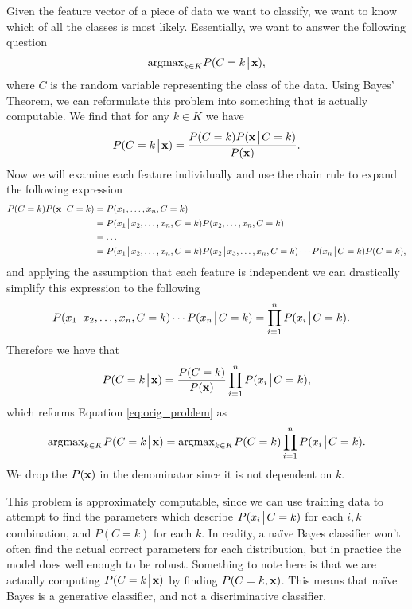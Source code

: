 Given the feature vector of a piece of data we want to classify, we want to know which of all the classes is most likely. Essentially, we want to answer the following question
\begin{equation}\label{eq:orig_problem}
    \mbox{argmax}_{k\in K} P(C=k \!\mathrel{\big|}\! \mathbf{x}),
\end{equation}
where $C$ is the random variable representing the class of the data.
Using Bayes' Theorem, we can reformulate this problem into something that is actually computable. We find that for any $k\in K$ we have
\begin{align*}
    P(C=k \!\mathrel{\big|}\! \mathbf{x}) = \frac{P(C=k)P(\mathbf{x} \!\mathrel{\big|}\! C=k)}{P(\mathbf{x})}.
\end{align*}
Now we will examine each feature individually and use the chain rule to expand the following expression
\begin{align*}
    P(C=k)P(\x \given C=k) &= P(x_1,\dots,x_n,C=k) \\
    &= P(x_1 \given x_2,\dots,x_n,C=k)P(x_2,\dots,x_n,C=k) \\
    &= \dots \\
    &= P(x_1 \given x_2,\dots,x_n,C=k)P(x_2 \given x_3, \dots, x_n,C=k)\cdots P(x_n \given C=k)P(C=k),
\end{align*}
and applying the assumption that each feature is independent we can drastically simplify this expression to the following
\begin{align*}
    P(x_1 \!\mathrel{\big|}\! x_2,\dots,x_n,C=k)\cdots P(x_n \!\mathrel{\big|}\! C=k) &= \prod_{i=1}^{n}P(x_i \!\mathrel{\big|}\! C=k).
\end{align*}
Therefore we have that 
\begin{align*}
    P(C=k \!\mathrel{\big|}\! \mathbf{x}) = \frac{P(C=k)}{P(\mathbf{x})} \prod_{i=1}^{n}P(x_i \!\mathrel{\big|}\! C=k),
\end{align*}
which reforms Equation \ref{eq:orig_problem} as
\begin{equation}\label{eq:simp_problem}
    \mbox{argmax}_{k\in K} P(C=k \!\mathrel{\big|}\! \mathbf{x}) = \mbox{argmax}_{k\in K} P(C=k)\prod_{i=1}^{n}P(x_i \!\mathrel{\big|}\! C=k).
\end{equation}
We drop the $P(\mathbf{x})$ in the denominator since it is not dependent on $k$.

This problem is approximately computable, since we can use training data to attempt to find the parameters which describe $P(x_i \!\mathrel{\big|}\! C=k)$ for each $i,k$ combination, and $P(C=k)$ for each $k$.
In reality, a naïve Bayes classifier won't often find the actual correct parameters for each distribution, but in practice the model does well enough to be robust.
Something to note here is that we are actually computing $P(C=k \!\mathrel{\big|}\! \mathbf{x})$ by finding $P(C=k,\mathbf{x})$.
This means that naïve Bayes is a generative classifier, and not a discriminative classifier.

